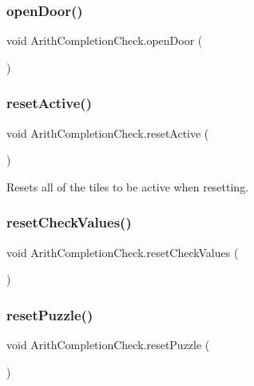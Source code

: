 \subsubsection{\texorpdfstring{open\+Door()}{openDoor()}}
{\footnotesize\ttfamily void Arith\+Completion\+Check.\+open\+Door (\begin{DoxyParamCaption}{ }\end{DoxyParamCaption})}

\mbox{\label{class_arith_completion_check_ab96e74dffadaa774579de016d1e4a355}} 
\subsubsection{\texorpdfstring{reset\+Active()}{resetActive()}}
{\footnotesize\ttfamily void Arith\+Completion\+Check.\+reset\+Active (\begin{DoxyParamCaption}{ }\end{DoxyParamCaption})}



Resets all of the tiles to be active when resetting. 

\mbox{\label{class_arith_completion_check_a2dd62a0cac8f383172e3a7ef51c3e3a9}} 
\subsubsection{\texorpdfstring{reset\+Check\+Values()}{resetCheckValues()}}
{\footnotesize\ttfamily void Arith\+Completion\+Check.\+reset\+Check\+Values (\begin{DoxyParamCaption}{ }\end{DoxyParamCaption})}

\mbox{\label{class_arith_completion_check_ab9599e148944886425068a34ae9b236b}} 
\subsubsection{\texorpdfstring{reset\+Puzzle()}{resetPuzzle()}}
{\footnotesize\ttfamily void Arith\+Completion\+Check.\+reset\+Puzzle (\begin{DoxyParamCaption}{ }\end{DoxyParamCaption})}

